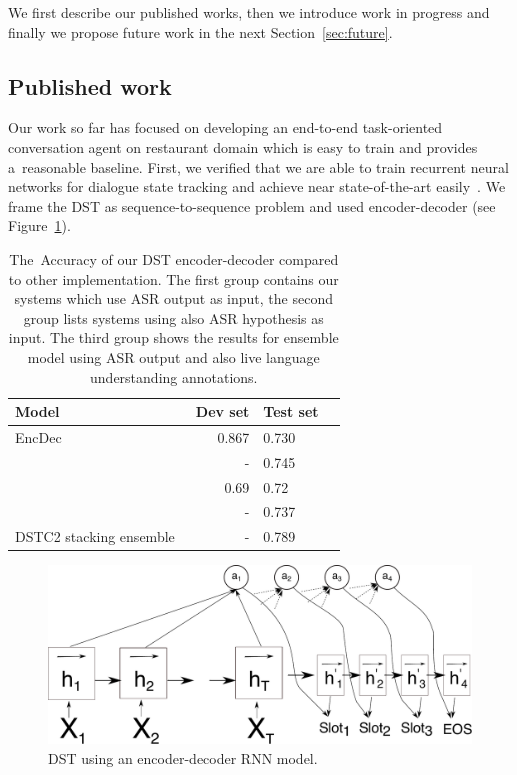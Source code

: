 \documentclass[11pt]{article}
\begin{document}
We first describe our published works, then we introduce work in progress and finally we propose future work in the next Section~\ref{sec:future}. 

\subsection{Published work}\label{sec:published}
Our work so far has focused on developing an end-to-end task-oriented conversation agent on restaurant domain which is easy to train and provides a~reasonable baseline.
First, we verified that we are able to train recurrent neural networks for dialogue state tracking and achieve near state-of-the-art easily~\cite{platek_recurrent_2016}. 
We frame the DST as sequence-to-sequence problem and used encoder-decoder (see Figure~\ref{fig:dst_seq2seq}). 

\begin{table}[tb]
\begin{center}
\begin{tabular}{l@{\quad}rll}
\hline
Model & Dev set & Test set\\
[2pt] \hline\rule{0pt}{12pt}
    EncDec  &   0.867 & 0.730 \\
\hline
    \cite{vodolan_hybrid_2015} & - & 0.745 \\
    \cite{zilka_incremental_2015} & 0.69 & 0.72 \\
    \cite{henderson2013deep} & - & 0.737 \\
\hline
    DSTC2 stacking ensemble~\cite{henderson2014second} & - & 0.789 \\
\hline
\end{tabular}
\caption{The~Accuracy of our DST encoder-decoder compared to other implementation. The first group contains our systems which use ASR output as input, the second group lists systems using also ASR hypothesis as input. The third group shows the results for ensemble model using ASR output and also live language understanding annotations.}
\end{center}
\label{tab:dstc}
\end{table}

\begin{figure}[htb]
    \centering
    \includegraphics[width=1.0\linewidth]{dst_seq2seq}
    \caption{DST using an encoder-decoder RNN model.}
\label{fig:dst_seq2seq}
\end{figure}
\end{document}
